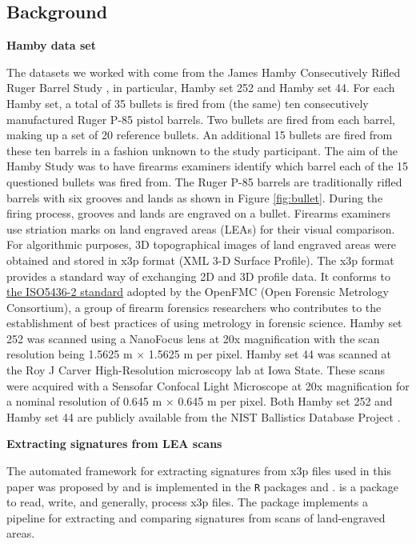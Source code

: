 \hypertarget{background}{%
\subsection{Background}\label{background}}

\textbf{Hamby data set}

The datasets we worked with come from the James Hamby Consecutively
Rifled Ruger Barrel Study \citep{brundage, hamby, Hamby:2019}, in
particular, Hamby set 252 and Hamby set 44. For each Hamby set, a total
of 35 bullets is fired from (the same) ten consecutively manufactured
Ruger P-85 pistol barrels. Two bullets are fired from each barrel,
making up a set of 20 reference bullets. An additional 15 bullets are
fired from these ten barrels in a fashion unknown to the study
participant. The aim of the Hamby Study was to have firearms examiners
identify which barrel each of the 15 questioned bullets was fired from.
The Ruger P-85 barrels are traditionally rifled barrels with six grooves
and lands as shown in Figure \ref{fig:bullet}. During the firing
process, grooves and lands are engraved on a bullet. Firearms examiners
use striation marks on land engraved areas (LEAs) for their visual
comparison. For algorithmic purposes, 3D topographical images of land
engraved areas were obtained and stored in x3p format (XML 3-D Surface
Profile). The x3p format provides a standard way of exchanging 2D and 3D
profile data. It conforms to
\href{http://sourceforge.net/p/open-gps/mwiki/X3p/}{the ISO5436-2
standard} adopted by the OpenFMC (Open Forensic Metrology Consortium), a
group of firearm forensics researchers who contributes to the
establishment of best practices of using metrology in forensic science.
Hamby set 252 was scanned using a NanoFocus lens at 20x magnification
with the scan resolution being 1.5625 \textmu m \(\times\) 1.5625
\textmu m per pixel. Hamby set 44 was scanned at the Roy J Carver
High-Resolution microscopy lab at Iowa State. These scans were acquired
with a Sensofar Confocal Light Microscope at 20x magnification for a
nominal resolution of 0.645 \textmu m \(\times\) 0.645 \textmu m per
pixel. Both Hamby set 252 and Hamby set 44 are publicly available from
the NIST Ballistics Database Project \citep{nistdb}.

\textbf{Extracting signatures from LEA scans}

The automated framework for extracting signatures from x3p files used in
this paper was proposed by \citet{aoas} and is implemented in the
\texttt{R} packages  \citep{x3ptools} and
 \citep{bulletxtrctr}.  is a package to
read, write, and generally, process x3p files. The 
package implements a pipeline for extracting and comparing signatures
from scans of land-engraved areas.

